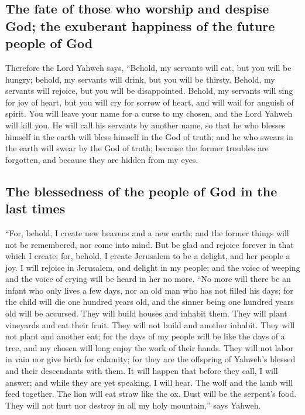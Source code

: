 \hypertarget{the-fate-of-those-who-worship-and-despise-god-the-exuberant-happiness-of-the-future-people-of-god}{%
\subsection{The fate of those who worship and despise God; the exuberant
happiness of the future people of
God}\label{the-fate-of-those-who-worship-and-despise-god-the-exuberant-happiness-of-the-future-people-of-god}}

 Therefore the Lord Yahweh says, ``Behold, my servants
will eat, but you will be hungry; behold, my servants will drink, but
you will be thirsty. Behold, my servants will rejoice, but you will be
disappointed.  Behold, my servants will sing for joy of
heart, but you will cry for sorrow of heart, and will wail for anguish
of spirit.  You will leave your name for a curse to my
chosen, and the Lord Yahweh will kill you. He will call his servants by
another name,  so that he who blesses himself in the
earth will bless himself in the God of truth; and he who swears in the
earth will swear by the God of truth; because the former troubles are
forgotten, and because they are hidden from my eyes.

\hypertarget{the-blessedness-of-the-people-of-god-in-the-last-times}{%
\subsection{The blessedness of the people of God in the last
times}\label{the-blessedness-of-the-people-of-god-in-the-last-times}}

 ``For, behold, I create new heavens and a new earth; and
the former things will not be remembered, nor come into mind.
 But be glad and rejoice forever in that which I create;
for, behold, I create Jerusalem to be a delight, and her people a joy.
 I will rejoice in Jerusalem, and delight in my people;
and the voice of weeping and the voice of crying will be heard in her no
more.  ``No more will there be an infant who only lives a
few days, nor an old man who has not filled his days; for the child will
die one hundred years old, and the sinner being one hundred years old
will be accursed.  They will build houses and inhabit
them. They will plant vineyards and eat their fruit. 
They will not build and another inhabit. They will not plant and another
eat; for the days of my people will be like the days of a tree, and my
chosen will long enjoy the work of their hands.  They
will not labor in vain nor give birth for calamity; for they are the
offspring of Yahweh's blessed and their descendants with them.
 It will happen that before they call, I will answer; and
while they are yet speaking, I will hear.  The wolf and
the lamb will feed together. The lion will eat straw like the ox. Dust
will be the serpent's food. They will not hurt nor destroy in all my
holy mountain,'' says Yahweh.

